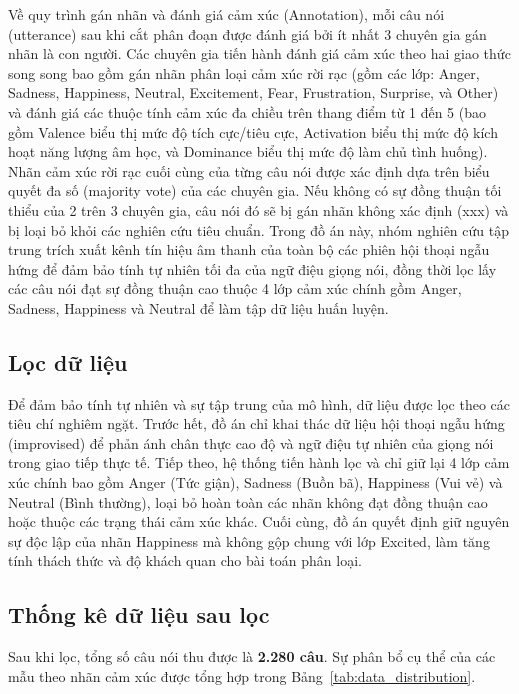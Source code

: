 Về quy trình gán nhãn và đánh giá cảm xúc (Annotation), mỗi câu nói (utterance) sau khi cắt phân đoạn được đánh giá bởi ít nhất 3 chuyên gia gán nhãn là con người. Các chuyên gia tiến hành đánh giá cảm xúc theo hai giao thức song song bao gồm gán nhãn phân loại cảm xúc rời rạc (gồm các lớp: Anger, Sadness, Happiness, Neutral, Excitement, Fear, Frustration, Surprise, và Other) và đánh giá các thuộc tính cảm xúc đa chiều trên thang điểm từ 1 đến 5 (bao gồm Valence biểu thị mức độ tích cực/tiêu cực, Activation biểu thị mức độ kích hoạt năng lượng âm học, và Dominance biểu thị mức độ làm chủ tình huống). Nhãn cảm xúc rời rạc cuối cùng của từng câu nói được xác định dựa trên biểu quyết đa số (majority vote) của các chuyên gia. Nếu không có sự đồng thuận tối thiểu của 2 trên 3 chuyên gia, câu nói đó sẽ bị gán nhãn không xác định (xxx) và bị loại bỏ khỏi các nghiên cứu tiêu chuẩn. Trong đồ án này, nhóm nghiên cứu tập trung trích xuất kênh tín hiệu âm thanh của toàn bộ các phiên hội thoại ngẫu hứng để đảm bảo tính tự nhiên tối đa của ngữ điệu giọng nói, đồng thời lọc lấy các câu nói đạt sự đồng thuận cao thuộc 4 lớp cảm xúc chính gồm Anger, Sadness, Happiness và Neutral để làm tập dữ liệu huấn luyện.

\subsection{Lọc dữ liệu}

Để đảm bảo tính tự nhiên và sự tập trung của mô hình, dữ liệu được lọc theo các tiêu chí nghiêm ngặt. Trước hết, đồ án chỉ khai thác dữ liệu hội thoại ngẫu hứng (improvised) để phản ánh chân thực cao độ và ngữ điệu tự nhiên của giọng nói trong giao tiếp thực tế. Tiếp theo, hệ thống tiến hành lọc và chỉ giữ lại 4 lớp cảm xúc chính bao gồm Anger (Tức giận), Sadness (Buồn bã), Happiness (Vui vẻ) và Neutral (Bình thường), loại bỏ hoàn toàn các nhãn không đạt đồng thuận cao hoặc thuộc các trạng thái cảm xúc khác. Cuối cùng, đồ án quyết định giữ nguyên sự độc lập của nhãn Happiness mà không gộp chung với lớp Excited, làm tăng tính thách thức và độ khách quan cho bài toán phân loại.

\subsection{Thống kê dữ liệu sau lọc}

Sau khi lọc, tổng số câu nói thu được là \textbf{2.280 câu}. Sự phân bổ cụ thể của các mẫu theo nhãn cảm xúc được tổng hợp trong Bảng~\ref{tab:data_distribution}.

